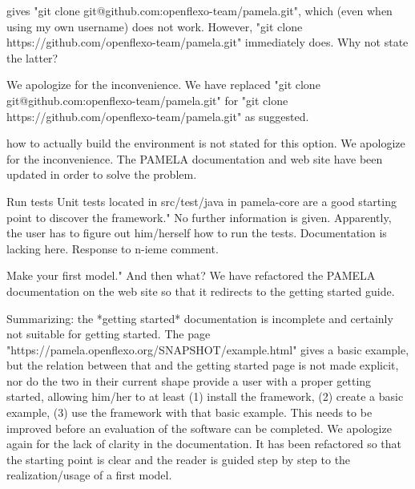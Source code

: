 \documentclass[10pt]{article}
\begin{document}

\begin{response}{gives "git clone git@github.com:openflexo-team/pamela.git", which (even when using my own username) does not work. However, "git clone https://github.com/openflexo-team/pamela.git" immediately does. Why not state the latter?
}

We apologize for the inconvenience. We have replaced "git clone git@github.com:openflexo-team/pamela.git" for "git clone https://github.com/openflexo-team/pamela.git" as suggested.
\end{response}

\begin{response}{how to actually build the environment is not stated for this option.}
We apologize for the inconvenience. The PAMELA documentation and web site have been updated in order to solve the problem.
\end{response}

\begin{response}{Run tests Unit tests located in src/test/java in pamela-core are a good starting point to discover the framework." No further information is given. Apparently, the user has to figure out him/herself how to run the tests. Documentation is lacking here.
}
  Response to n-ieme comment.
\end{response}

\begin{response}{Make your first model." And then what?
}
We have refactored the PAMELA documentation on the web site so that it redirects to the getting started guide.
\end{response}

\begin{response}{Summarizing: the *getting started* documentation is incomplete and certainly not suitable for getting started. The page "https://pamela.openflexo.org/SNAPSHOT/example.html" gives a basic example, but the relation between that and the getting started page is not made explicit, nor do the two in their current shape provide a user with a proper getting started, allowing him/her to at least (1) install the framework, (2) create a basic example, (3) use the framework with that basic example. This needs to be improved before an evaluation of the software can be completed.
}
We apologize again for the lack of clarity in the documentation. It has been refactored so that the starting point is clear and the reader is guided step by step to the realization/usage of a first model.
\end{response}
\end{document}
